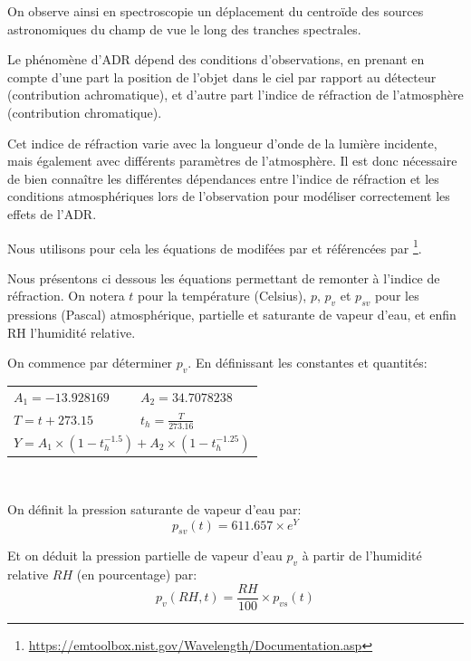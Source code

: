 \documentclass[../main/main.tex]{subfiles}
\begin{document}
On observe ainsi en spectroscopie un déplacement du centroïde des
sources astronomiques du champ de vue le long des tranches spectrales.

Le phénomène d'ADR dépend des conditions d'observations, en prenant en
compte d'une part la position de l'objet dans le ciel par rapport au
détecteur (contribution achromatique), et d'autre part
l'indice de réfraction de l'atmosphère (contribution chromatique).

Cet indice de réfraction varie avec la longueur d'onde de la lumière
incidente, mais également avec différents paramètres de l'atmosphère. Il
est donc nécessaire de bien connaître les différentes dépendances entre
l'indice de réfraction et les conditions atmosphériques lors de
l'observation pour modéliser correctement les effets de l'ADR.

Nous utilisons pour cela les équations de \citet{Edlen1966} modifées
par \citet{Birch1993, Birch1994} et référencées par \citet{Stone2001}\footnote{\url{https://emtoolbox.nist.gov/Wavelength/Documentation.asp}}.

Nous présentons ci dessous les équations permettant de remonter à
l'indice de réfraction. On notera $t$ pour la température (Celsius),
$p$, $p_{v}$ et $p_{sv}$ pour les pressions (Pascal) atmosphérique,
partielle et saturante de
vapeur d'eau, et enfin RH l'humidité relative.

On commence par déterminer $p_{v}$.
En définissant les constantes et quantités:

\begin{center}
  \renewcommand{\arraystretch}{1.5}
  \begin{tabular}{ll}
   
$A_1= -13.928169$ & $A_2 = 34.7078238$ \\
$T= t + 273.15$ & $t_h = \frac{T}{273.16}$ \\
  \multicolumn{2}{c}{$Y = A_1 \times(1 - t_h^{-1.5}) + A_2 \times (1 - t_h^{-1.25})$}
\end{tabular}\\
\end{center}

On définit la pression saturante de vapeur d'eau par:
\begin{equation}
  \label{eq:pvs}
    p_{sv}(t) = 611.657 \times e^{Y}
\end{equation}

Et on déduit la pression partielle de vapeur d'eau $p_v$ à partir de
l'humidité relative $RH$ (en pourcentage) par:
\begin{equation}
 \label{eq:pv}
    p_v(RH,t) = \frac{RH}{100}\times p_{vs}(t)
\end{equation}
\end{document}
